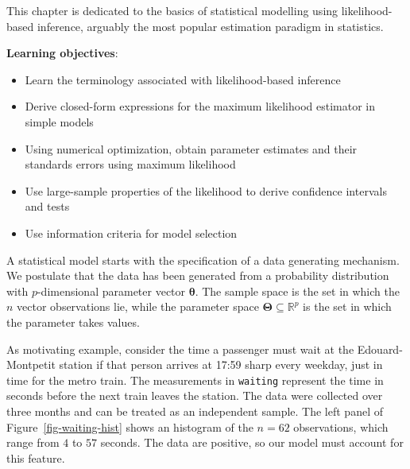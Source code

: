 \documentclass[
  11pt,
  letterpaper,
]{scrbook}
\providecommand{\tightlist}{%
  \setlength{\itemsep}{0pt}\setlength{\parskip}{0pt}}\usepackage{longtable,booktabs,array}
\theoremstyle{plain}
\theoremstyle{definition}
\theoremstyle{definition}
\theoremstyle{remark}
\begin{document}
This chapter is dedicated to the basics of statistical modelling using
likelihood-based inference, arguably the most popular estimation
paradigm in statistics.

\begin{tcolorbox}[enhanced jigsaw, colback=white, opacityback=0, colframe=quarto-callout-important-color-frame, bottomrule=.15mm, coltitle=black, titlerule=0mm, left=2mm, leftrule=.75mm, breakable, colbacktitle=quarto-callout-important-color!10!white, bottomtitle=1mm, toptitle=1mm, rightrule=.15mm, toprule=.15mm, arc=.35mm, title=\textcolor{quarto-callout-important-color}{\faExclamation}\hspace{0.5em}{Important}, opacitybacktitle=0.6]

\textbf{Learning objectives}:

\begin{itemize}
\tightlist
\item
  Learn the terminology associated with likelihood-based inference
\item
  Derive closed-form expressions for the maximum likelihood estimator in
  simple models
\item
  Using numerical optimization, obtain parameter estimates and their
  standards errors using maximum likelihood
\item
  Use large-sample properties of the likelihood to derive confidence
  intervals and tests
\item
  Use information criteria for model selection
\end{itemize}

\end{tcolorbox}

A statistical model starts with the specification of a data generating
mechanism. We postulate that the data has been generated from a
probability distribution with \(p\)-dimensional parameter vector
\(\boldsymbol{\theta}.\) The sample space is the set in which the \(n\)
vector observations lie, while the parameter space
\(\boldsymbol{\Theta} \subseteq \mathbb{R}^p\) is the set in which the
parameter takes values.

As motivating example, consider the time a passenger must wait at the
Edouard-Montpetit station if that person arrives at 17:59 sharp every
weekday, just in time for the metro train. The measurements in
\texttt{waiting} represent the time in seconds before the next train
leaves the station. The data were collected over three months and can be
treated as an independent sample. The left panel of
Figure~\ref{fig-waiting-hist} shows an histogram of the \(n=62\)
observations, which range from \(4\) to \(57\) seconds. The data are
positive, so our model must account for this feature.
\end{document}
